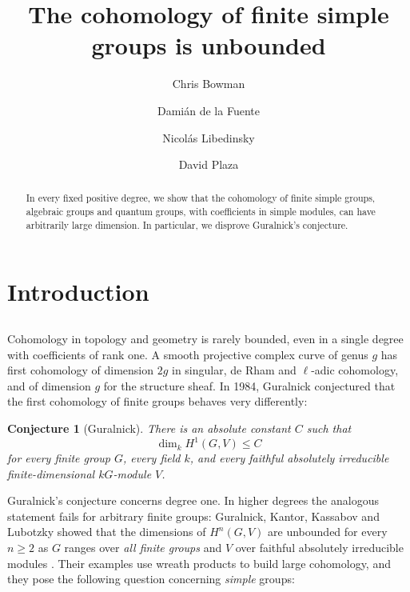 \documentclass[11pt,a4paper,reqno]{amsart}
\title[The   cohomology of  finite simple groups is unbounded]{The   cohomology of     finite simple groups is unbounded}
\author{Chris Bowman}
\author{Dami\'an de la Fuente}
\author{Nicol\'as Libedinsky}
\author{David Plaza}
\date{}
\numberwithin{equation}{section}
\theoremstyle{definition}
\theoremstyle{remark}
\theoremstyle{plain}
\newtheorem*{guralnickconjecture}{Conjecture}
\begin{document}
\begin{abstract}
In every fixed positive degree, we show that the cohomology
of finite simple groups, algebraic groups and quantum groups,
with coefficients in simple modules, can have arbitrarily
large dimension. In particular, we disprove Guralnick's conjecture. 
 \end{abstract}
\maketitle


\vspace{-0.6cm}
\section{Introduction}



\subsection{} 
Cohomology in topology and geometry is rarely bounded, even in a single degree with coefficients of rank one. A smooth projective complex curve of genus $g$ has first cohomology of dimension $2g$ in singular, de Rham and $\ell$-adic cohomology, and of dimension $g$ for the structure sheaf.
In 1984, Guralnick conjectured \cite[Conjecture~2]{Guralnick} that the first cohomology of finite groups behaves very differently:
\begin{guralnickconjecture}[Guralnick]
There is an absolute constant $C$ such that
\[
\dim_k H^1(G,V)\le C
\]
for every finite group $G$, every field $k$, and every faithful
absolutely irreducible finite-dimensional $kG$-module $V$.
\end{guralnickconjecture}


 



Guralnick's conjecture concerns degree one. 
In higher degrees the analogous statement fails for arbitrary finite groups: Guralnick, Kantor, Kassabov and Lubotzky showed that   the dimensions of $H^n(G,V)$ are unbounded  for every $n\ge2$ as $G$ ranges over {\em all finite groups} and $V$ over faithful absolutely irreducible modules \cite[Theorems~12.3 and~12.6]{GKKL2007}.
Their examples use wreath products to build large cohomology, 
and they pose the following question concerning {\em simple} groups:
\end{document}
